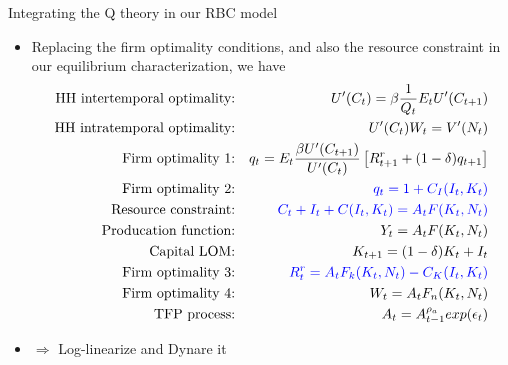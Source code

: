 \documentclass[9pt,xcolor={dvipsnames}]{beamer}
\newcommand{\bit}{\begin{itemize}}
\newcommand{\eit}{\end{itemize}}
\newcommand{\bc}{\color{blue}}
\begin{document}
\begin{frame}{Integrating the Q theory in our RBC model}

\bit
\setlength\itemsep{1.5em} 

\item Replacing the firm optimality conditions, and also the resource constraint in our equilibrium characterization, we have
\begin{eqnarray}
\text{HH intertemporal optimality:} && U'(C_t) = \beta\frac{1}{Q_t} E_t U'(C_{t+1}) \nonumber \\
\text{HH intratemporal optimality:} && U'(C_t)W_t = V'(N_t) \nonumber \\
\text{Firm optimality 1:} && q_t = E_t \frac{\beta U'(C_{t+1})}{U'(C_{t})} \left[R^r_{t+1} + (1-\delta)q_{t+1} \right] \nonumber  \\ 
\text{Firm optimality 2:} && {\bc q_t = 1+C_I(I_t, K_t)} \nonumber \\
\text{Resource constraint:} && {\bc C_t + I_t + C(I_t, K_t) = A_t F(K_t, N_t)} \nonumber \\
\text{Producation function:} && Y_t = A_t F(K_t, N_t) \nonumber \\
\text{Capital LOM:} && K_{t+1} = (1-\delta) K_t + I_t \nonumber \\
\text{Firm optimality 3:} && {\bc R^{r}_t = A_t F_k (K_t, N_t) - C_K(I_{t}, K_{t})} \nonumber \\
\text{Firm optimality 4:} && W_t = A_t F_n (K_t, N_t) \nonumber \\
\text{TFP process:} && A_t = A_{t-1}^{\rho_a}exp(\epsilon_t) \nonumber
\end{eqnarray}

\item $\Rightarrow$ Log-linearize and Dynare it

\eit

\end{frame}
\end{document}
